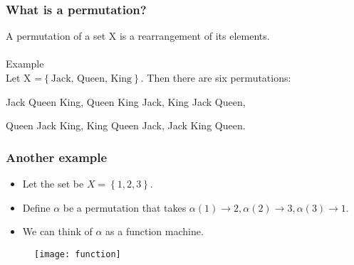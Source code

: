 \documentclass{beamer}
\begin{document}
\begin{frame}
  \frametitle{What is a permutation?}
A permutation of a set X is a rearrangement of its elements. \\
\textcolor{white}{.}\\
Example\\
Let X =$ \left \{\mbox{Jack, Queen, King} \right\} $. Then there are six permutations: 


Jack Queen King, \qquad Queen King Jack, \qquad King Jack Queen, 

Queen Jack King, \qquad King Queen Jack, \qquad Jack King Queen.
  

\end{frame}







\begin{frame}
  \frametitle{Another example}
  \begin{itemize}
  \item Let the set be $X = \left \{1,2,3 \right\}$.
    \item Define $\alpha$ be a permutation that takes $\alpha(1) \rightarrow 2, \alpha(2) \rightarrow 3, \alpha(3) \rightarrow 1.$ 
      \item We can think of $\alpha$ as a function machine. 
  \end{itemize}




%



\begin{figure}[h]
  \centering
  \texttt{[image: function]}
\end{figure}

\end{frame}
\end{document}
